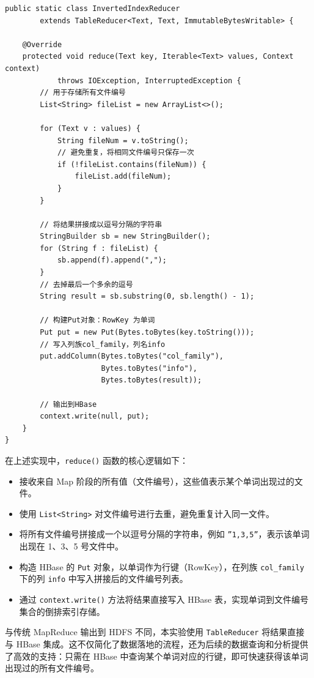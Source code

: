 \documentclass[]{bitreport}
\begin{document}
\begin{lstlisting}[style=java, caption={Reducer核心代码}]
public static class InvertedIndexReducer 
        extends TableReducer<Text, Text, ImmutableBytesWritable> {
    
    @Override
    protected void reduce(Text key, Iterable<Text> values, Context context) 
            throws IOException, InterruptedException {
        // 用于存储所有文件编号
        List<String> fileList = new ArrayList<>();
        
        for (Text v : values) {
            String fileNum = v.toString();
            // 避免重复，将相同文件编号只保存一次
            if (!fileList.contains(fileNum)) {
                fileList.add(fileNum);
            }
        }
        
        // 将结果拼接成以逗号分隔的字符串
        StringBuilder sb = new StringBuilder();
        for (String f : fileList) {
            sb.append(f).append(",");
        }
        // 去掉最后一个多余的逗号
        String result = sb.substring(0, sb.length() - 1);
        
        // 构建Put对象：RowKey 为单词
        Put put = new Put(Bytes.toBytes(key.toString()));
        // 写入列族col_family，列名info
        put.addColumn(Bytes.toBytes("col_family"), 
                      Bytes.toBytes("info"), 
                      Bytes.toBytes(result));
        
        // 输出到HBase
        context.write(null, put);
    }
}
\end{lstlisting}

在上述实现中，\texttt{reduce()} 函数的核心逻辑如下：
\begin{itemize}
  \item 接收来自 Map 阶段的所有值（文件编号），这些值表示某个单词出现过的文件。
  \item 使用 \texttt{List<String>} 对文件编号进行去重，避免重复计入同一文件。
  \item 将所有文件编号拼接成一个以逗号分隔的字符串，例如 \texttt{''1,3,5''}，表示该单词出现在 1、3、5 号文件中。
  \item 构造 HBase 的 \texttt{Put} 对象，以单词作为行键（RowKey），在列族 \texttt{col\_family} 下的列 \texttt{info} 中写入拼接后的文件编号列表。
  \item 通过 \texttt{context.write()} 方法将结果直接写入 HBase 表，实现单词到文件编号集合的倒排索引存储。
\end{itemize}

与传统 MapReduce 输出到 HDFS 不同，本实验使用 \texttt{TableReducer} 将结果直接与 HBase 集成。这不仅简化了数据落地的流程，还为后续的数据查询和分析提供了高效的支持：只需在 HBase 中查询某个单词对应的行键，即可快速获得该单词出现过的所有文件编号。
\end{document}
